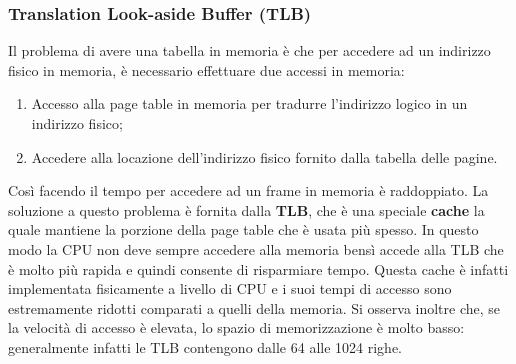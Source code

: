 \subsubsection{Translation Look-aside Buffer (TLB)}
Il problema di avere una tabella in memoria è che per accedere ad un indirizzo fisico in memoria, è necessario effettuare due accessi in memoria:
\vspace{-4px}
\begin{enumerate}
\setlength{\itemsep}{-1px}
    \item Accesso alla page table in memoria per tradurre l'indirizzo logico in un indirizzo fisico;
    \item Accedere alla locazione dell'indirizzo fisico fornito dalla tabella delle pagine.
\end{enumerate}
Così facendo il tempo per accedere ad un frame in memoria è raddoppiato. La soluzione a questo problema è fornita dalla \textbf{TLB}, che è una speciale \textbf{cache} la quale mantiene la porzione della page table che è usata più spesso. In questo modo la CPU non deve sempre accedere alla memoria bensì accede alla TLB che è molto più rapida e quindi consente di risparmiare tempo. Questa cache è infatti implementata fisicamente a livello di CPU e i suoi tempi di accesso sono estremamente ridotti comparati a quelli della memoria. Si osserva inoltre che, se la velocità di accesso è elevata, lo spazio di memorizzazione è molto basso: generalmente infatti le TLB contengono dalle 64 alle 1024 righe.

